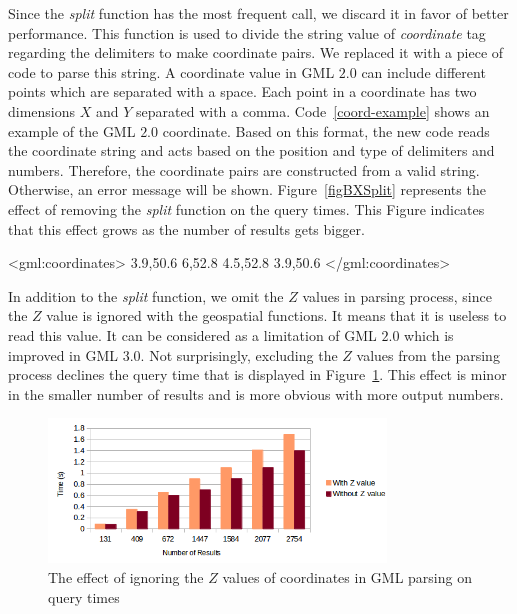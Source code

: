 \documentclass[a4paper,12pt]{article}
\begin{document}
Since the \textit{split} function has the most frequent call, we discard it in favor of better performance. This function is used to divide the string value of \textit{coordinate} tag regarding the delimiters to make coordinate pairs. We replaced it with a piece of code to parse this string. 
A coordinate value in GML $2.0$ can include different points which are separated with a space. Each point in a coordinate has two dimensions $X$ and $Y$ separated with a comma. Code~\ref{coord-example} shows an example of the GML $2.0$ coordinate. Based on this format, the new code reads the coordinate string and acts based on the position and type of delimiters and numbers. Therefore, the coordinate pairs are constructed from a valid string. Otherwise, an error message will be shown. Figure~\ref{figBXSplit} represents the effect of removing the \textit{split} function on the query times. This Figure indicates that this effect grows as the number of results gets bigger.
 
\vspace{10px}
\begin{fakeXML}[label=coord-example,caption=An example of GML 2.0 coordinate]
<gml:coordinates>
  3.9,50.6 6,52.8 4.5,52.8 3.9,50.6
</gml:coordinates>
\end{fakeXML}
\vspace{10px}

In addition to the \textit{split} function, we omit the $Z$ values in parsing process, since the $Z$ value is ignored with the geospatial functions. It means that it is useless to read this value. It can be considered as a limitation of GML $2.0$ which is improved in GML $3.0$. Not surprisingly, excluding the $Z$ values from the parsing process declines the query time that is displayed in Figure~\ref{figBXZvalue}. This effect is minor in the smaller number of results and is more obvious with more output numbers.

\begin{figure}
\centering
\includegraphics[width=0.8\textwidth,height=0.2\textheight]{BXZvalue-sec}
\caption{The effect of ignoring the $Z$ values of coordinates in GML parsing on query times}
\label{figBXZvalue}
\end{figure}
\end{document}
